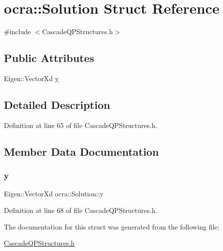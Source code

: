 \hypertarget{structocra_1_1Solution}{}\section{ocra\+:\+:Solution Struct Reference}
\label{structocra_1_1Solution}


{\ttfamily \#include $<$Cascade\+Q\+P\+Structures.\+h$>$}

\subsection*{Public Attributes}
\begin{DoxyCompactItemize}
\item 
Eigen\+::\+Vector\+Xd \hyperlink{structocra_1_1Solution_a1b80abc6ec96a3245cf3813c20f417f9}{y}
\end{DoxyCompactItemize}


\subsection{Detailed Description}


Definition at line 65 of file Cascade\+Q\+P\+Structures.\+h.



\subsection{Member Data Documentation}
\hypertarget{structocra_1_1Solution_a1b80abc6ec96a3245cf3813c20f417f9}{}\label{structocra_1_1Solution_a1b80abc6ec96a3245cf3813c20f417f9} 
\subsubsection{\texorpdfstring{y}{y}}
{\footnotesize\ttfamily Eigen\+::\+Vector\+Xd ocra\+::\+Solution\+::y}



Definition at line 68 of file Cascade\+Q\+P\+Structures.\+h.



The documentation for this struct was generated from the following file\+:\begin{DoxyCompactItemize}
\item 
\hyperlink{CascadeQPStructures_8h}{Cascade\+Q\+P\+Structures.\+h}\end{DoxyCompactItemize}
